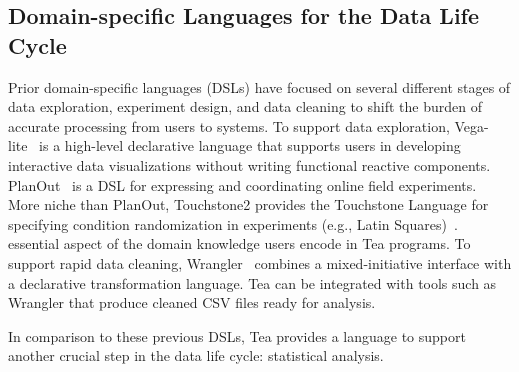 \subsection{Domain-specific Languages for the Data Life Cycle}
Prior domain-specific languages (DSLs) have focused on several different stages
of data exploration, experiment design, and data cleaning to shift the burden of
accurate processing from users to systems. To support data exploration,
Vega-lite~\cite{satyanarayan2017vega} is a high-level declarative language that
supports users in developing interactive data visualizations without writing
functional reactive components. PlanOut~\cite{bakshy2014planout} is a DSL for
expressing and coordinating online field experiments. More niche than PlanOut,
Touchstone2 provides the Touchstone Language for specifying condition
randomization in experiments (e.g., Latin
Squares)~\cite{eiselmayer2019touchstone2}.%
essential aspect of the domain knowledge users encode in Tea programs. To
support rapid data cleaning,  Wrangler~\cite{kandel2011wrangler} combines a
mixed-initiative interface with a declarative transformation language. Tea can
be integrated with tools such as Wrangler that produce cleaned CSV files ready
for analysis.

In comparison to these previous DSLs, Tea provides a language to support another crucial step in the data life cycle: statistical analysis. 



\vspace{-13pt}
